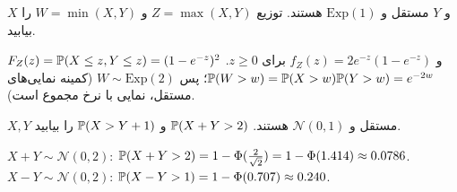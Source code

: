 \begin{exercise}
$X$ و $Y$ مستقل و $\mathrm{Exp}(1)$ هستند. توزیع $Z=\max(X,Y)$ و $W=\min(X,Y)$ را بیابید.
\end{exercise}
\begin{solution}
$F_Z(z)=\mathbb{P}(X\le z,Y\le z)=(1-e^{-z})^2$ و $f_Z(z)=2e^{-z}(1-e^{-z})$ برای $z\ge0$.
$\mathbb{P}(W>w)=\mathbb{P}(X>w)\mathbb{P}(Y>w)=e^{-2w}$؛ پس $W\sim\mathrm{Exp}(2)$ (کمینه نمایی‌های مستقل، نمایی با نرخ مجموع است).
\end{solution}

\begin{exercise}
$X,Y$ مستقل و $\mathcal N(0,1)$ هستند. $\mathbb{P}(X+Y>2)$ و $\mathbb{P}(X>Y+1)$ را بیابید.
\end{exercise}
\begin{solution}
$X+Y\sim\mathcal N(0,2)$: $\mathbb{P}(X+Y>2)=1-\Phi(\frac{2}{\sqrt2})=1-\Phi(1.414)\approx0.0786$.
$X-Y\sim\mathcal N(0,2)$: $\mathbb{P}(X-Y>1)=1-\Phi(0.707)\approx0.240$.
\end{solution}

